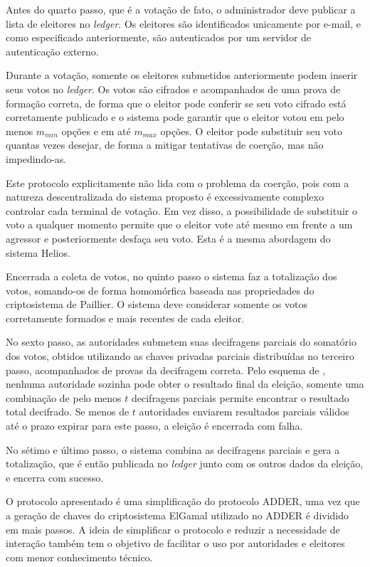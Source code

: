 Antes do quarto passo, que é a votação de fato, o administrador deve publicar a
lista de eleitores no \textit{ledger}. Os eleitores são identificados
unicamente por e-mail, e como especificado anteriormente, são autenticados por
um servidor de autenticação externo.

Durante a votação, somente os eleitores submetidos anteriormente podem inserir
seus votos no \textit{ledger}. Os votos são cifrados e acompanhados de uma
prova de formação correta, de forma que o eleitor pode conferir se seu voto
cifrado está corretamente publicado e o sistema pode garantir que o eleitor
votou em pelo menos $m_{min}$ opções e em até $m_{max}$ opções. O eleitor pode
substituir seu voto quantas vezes desejar, de forma a mitigar tentativas de
coerção, mas não impedindo-as.

Este protocolo explicitamente não lida com o problema da coerção, pois com a
natureza descentralizada do sistema proposto é excessivamente complexo
controlar cada terminal de votação. Em vez disso, a possibilidade de substituir
o voto a qualquer momento permite que o eleitor vote até mesmo em frente a um
agressor e posteriormente desfaça seu voto. Esta é a mesma abordagem do sistema
Helios.

Encerrada a coleta de votos, no quinto passo o sistema faz a totalização dos
votos, somando-os de forma homomórfica baseada nas propriedades do
criptosistema de Paillier. O sistema deve considerar somente os votos
corretamente formados e mais recentes de cada eleitor.

No sexto passo, as autoridades submetem suas decifragens parciais do somatório
dos votos, obtidos utilizando as chaves privadas parciais distribuídas no
terceiro passo, acompanhados de provas da decifragem correta. Pelo esquema de
\textcite{fouque2000sharing}, nenhuma autoridade sozinha pode obter o resultado
final da eleição, somente uma combinação de pelo menos $t$ decifragens parciais
permite encontrar o resultado total decifrado. Se menos de $t$ autoridades
enviarem resultados parciais válidos até o prazo expirar para este passo, a
eleição é encerrada com falha.

No sétimo e último passo, o sistema combina as decifragens parciais e gera a
totalização, que é então publicada no \textit{ledger} junto com os outros dados
da eleição, e encerra com sucesso.

O protocolo apresentado é uma simplificação do protocolo ADDER, uma vez que a
geração de chaves do criptosistema ElGamal utilizado no ADDER é dividido em
mais passos. A ideia de simplificar o protocolo e reduzir a necessidade de
interação também tem o objetivo de facilitar o uso por autoridades e eleitores
com menor conhecimento técnico.
